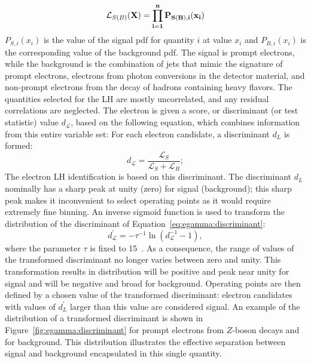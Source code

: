 \begin{equation}
\mathcal{L}_{S(B)}(\bf{X})=\prod_{i=1}^{n} P_{S(B),i}(x_{i})
\label{eq:likelihoods}
\end{equation}
$P_{S,i}(x_{i})$ is the value of the signal pdf for quantity $i$ at value $x_i$ and
$P_{B,i}(x_{i})$ is the corresponding value of the background pdf.
The signal is prompt electrons, while the background is the combination of jets that mimic the signature of prompt electrons, electrons from photon conversions in the detector material, and non-prompt electrons from the decay of hadrons containing heavy flavors.
The quantities selected for the LH are mostly uncorrelated, and any residual correlations are neglected.
The electron is given a score, or discriminant (or test statistic) value $d_{\mathcal{L}}$, based on the following equation, which combines information from this entire variable set:
For each electron candidate, a discriminant $d_{L}$ is formed: 
\begin{equation}
  \label{eq:egamma:discriminant}
d_{\mathcal{L}} = \frac{\mathcal{L}_{S}}{\mathcal{L}_{S} + \mathcal{L}_{B}};
\end{equation}
The electron LH identification is based on this discriminant.
The discriminant $d_L$ nominally has a sharp peak at unity (zero) for signal (background); this sharp peak makes it inconvenient to select operating points as it would require extremely fine binning.
An inverse sigmoid function is used to transform the distribution of the discriminant of Equation~\ref{eq:egamma:discriminant}:
\begin{equation*}
  \label{eq:inverse_sigmoid_transformation}
  d^\prime_{\mathcal{L}} = -\tau^{-1}\ln(d_{\mathcal{L}}^{-1} - 1),
\end{equation*}
where the parameter $\tau$ is fixed to 15~\cite{Hocker}.
As a consequence, the range of values of the transformed discriminant no longer varies between zero and unity.
This transformation results in distribution will be positive and peak near unity for signal and will be negative and broad for background. 
Operating points are then defined by a chosen value of the transformed discriminant: electron candidates with values of $d^\prime_{L}$ larger than this value are considered signal.
An example of the distribution of a transformed discriminant is shown in Figure~\ref{fig:egamma:discriminant} for prompt electrons from $Z$-boson decays and for background.
This distribution illustrates the effective separation between signal and background encapsulated in this single quantity.
